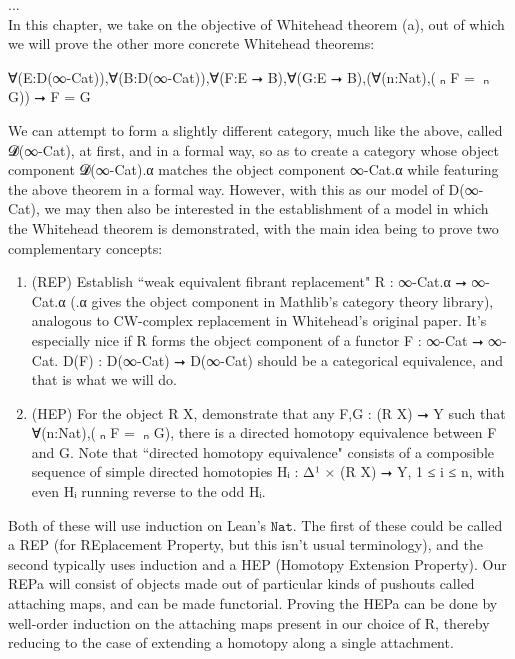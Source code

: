 \documentclass{book}
\theoremstyle{definition}
\begin{document}
...\\

\iffalse
In this chapter, we take on the objective of Whitehead theorem (a), out of which we will prove the other more concrete Whitehead theorems:\\

\begin{center} ∀(E:D(∞-Cat)),∀(B:D(∞-Cat)),∀(F:E ⭢ B),∀(G:E ⭢ B),(∀(n:Nat),(π⃗ₙ F = π⃗ₙ G)) ⭢ F = G
\end{center}

We can attempt to form a slightly different category, much like the above, called 𝓓(∞-Cat), at first, and in a formal way, so as to create a category whose object component 𝓓(∞-Cat).α matches the object component ∞-Cat.α while featuring the above theorem in a formal way. However, with this as our model of D(∞-Cat), we may then also be interested in the establishment of a model in which the Whitehead theorem is demonstrated, with the main idea being to prove two complementary concepts:

\begin{enumerate}
\item (REP) Establish ``weak equivalent fibrant replacement" R : ∞-Cat.α ⭢ ∞-Cat.α (.α gives the object component in Mathlib's category theory library), analogous to CW-complex replacement in Whitehead's original paper. It's especially nice if R forms the object component of a functor F : ∞-Cat ⭢ ∞-Cat. D(F) : D(∞-Cat) ⭢ D(∞-Cat) should be a categorical equivalence, and that is what we will do.
\item (HEP) For the object R X, demonstrate that any F,G : (R X) ⭢ Y such that ∀(n:Nat),(π⃗ₙ F = π⃗ₙ G), there is a directed homotopy equivalence between F and G. Note that ``directed homotopy equivalence" consists of a composible sequence of simple directed homotopies Hᵢ : Δ¹ × (R X) ⭢ Y, 1 ≤ i ≤ n, with even Hᵢ running reverse to the odd Hᵢ.
\end{enumerate} 

Both of these will use induction on Lean's $\texttt{Nat}$. The first of these could be called a REP (for REplacement Property, but this isn't usual terminology), and the second typically uses induction and a HEP (Homotopy Extension Property). Our REPa will consist of objects made out of particular kinds of pushouts called attaching maps, and can be made functorial. Proving the HEPa can be done by well-order induction on the attaching maps present in our choice of R, thereby reducing to the case of extending a homotopy along a single attachment.\\
\end{document}
